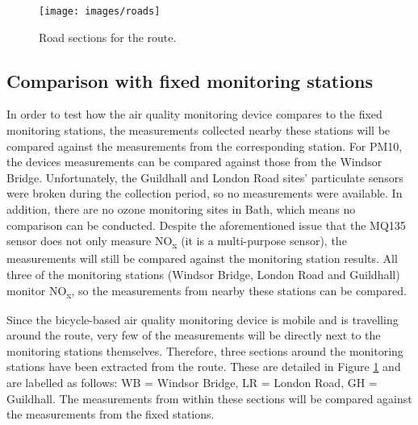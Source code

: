 \documentclass[11pt,twosided,a4paper]{report}
\begin{document}

\begin{figure}[!tb]
\centering
\texttt{[image: images/roads]}
\caption[Road sections.]{Road sections for the route.}
\label{fig:roads}
\end{figure}



%

\subsection{Comparison with fixed monitoring stations}

In order to test how the air quality monitoring device compares to the fixed monitoring stations, the measurements collected nearby these stations will be compared against the measurements from the corresponding station. For PM10, the devices measurements can be compared against those from the Windsor Bridge. Unfortunately, the Guildhall and London Road sites' particulate sensors were broken during the collection period, so no measurements were available. In addition, there are no ozone monitoring sites in Bath, which means no comparison can be conducted. Despite the aforementioned issue that the MQ135 sensor does not only measure NO\textsubscript{x} (it is a multi-purpose sensor), the measurements will still be compared against the monitoring station results. All three of the monitoring stations (Windsor Bridge, London Road and Guildhall) monitor NO\textsubscript{x}, so the measurements from nearby these stations can be compared.

Since the bicycle-based air quality monitoring device is mobile and is travelling around the route, very few of the measurements will be directly next to the monitoring stations themselves. Therefore, three sections around the monitoring stations have been extracted from the route. These are detailed in Figure \ref{fig:roads} and are labelled as follows: WB = Windsor Bridge, LR = London Road, GH = Guildhall. The measurements from within these sections will be compared against the measurements from the fixed stations.
\end{document}
